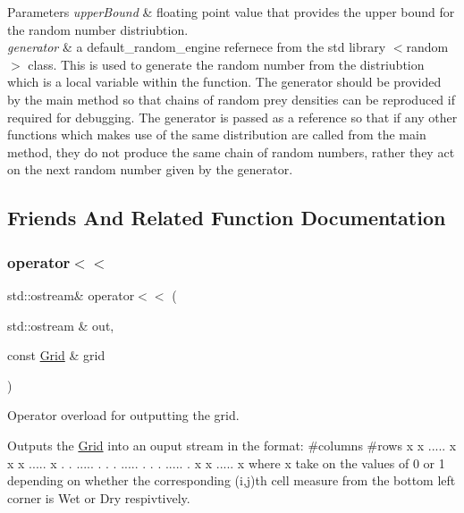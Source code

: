 \begin{DoxyParams}{Parameters}
{\em upper\+Bound} & floating point value that provides the upper bound for the random number distriubtion.\\
\hline
{\em generator} & a default\+\_\+random\+\_\+engine refernece from the std library $<$random$>$ class. This is used to generate the random number from the distriubtion which is a local variable within the function. The generator should be provided by the main method so that chains of random prey densities can be reproduced if required for debugging. The generator is passed as a reference so that if any other functions which makes use of the same distribution are called from the main method, they do not produce the same chain of random numbers, rather they act on the next random number given by the generator. \\
\hline
\end{DoxyParams}


\subsection{Friends And Related Function Documentation}
\mbox{\label{class_grid_a3513576c9cced69b185e4be8fe248e8c}} 
\subsubsection{\texorpdfstring{operator$<$$<$}{operator<<}}
{\footnotesize\ttfamily std\+::ostream\& operator$<$$<$ (\begin{DoxyParamCaption}\item[{std\+::ostream \&}]{out,  }\item[{const \hyperlink{class_grid}{Grid} \&}]{grid }\end{DoxyParamCaption})\hspace{0.3cm}{\ttfamily [friend]}}



Operator overload for outputting the grid. 

Outputs the \hyperlink{class_grid}{Grid} into an ouput stream in the format\+: \#columns \#rows x x ..... x x x ..... x . . ..... . . . ..... . . . ..... . x x ..... x where x take on the values of 0 or 1 depending on whether the corresponding (i,j)th cell measure from the bottom left corner is Wet or Dry respivtively.

